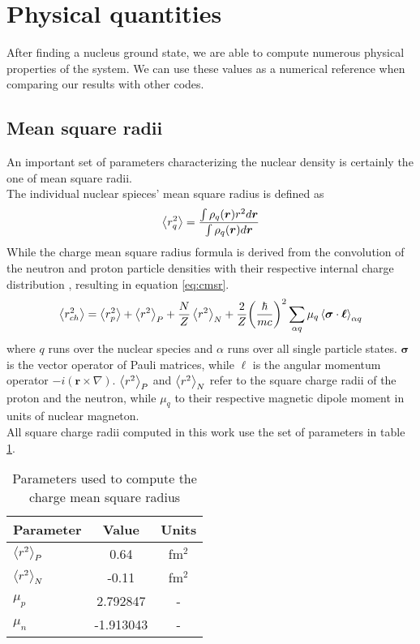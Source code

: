\section{Physical quantities}
After finding a nucleus ground state, we are able to compute numerous physical properties of the system. We can use these values as a numerical reference when comparing our results with other codes.
\subsection{Mean square radii}
An important set of parameters characterizing the nuclear density is certainly the one of mean square radii.
\\The individual nuclear spieces' mean square radius is defined as
\begin{equation}
    \label{eq:msr}
    \expval{r^2_q} = \frac{\int\rho_q(\bm r) r^2 d\bm r}{\int \rho_q(\bm r) d\bm r}
\end{equation}
While the charge mean square radius formula is derived from the convolution of the neutron and proton particle densities with their respective internal charge distribution \cite{BERTOZZI1972408}, resulting in equation \ref{eq:cmsr}.
\begin{equation}
    \label{eq:cmsr}
    \expval{r^2_{ch}} = \expval{r^2_p} + \expval{r^2}_P + \frac N Z \expval{r^2}_N + \frac 2 Z \bigg(\frac{ \hbar}{mc}\bigg)^2\sum_{\alpha q}\mu_q \expval{\bm \sigma\cdot \bm {\ell}}_{\alpha q}
\end{equation}
where $q$ runs over the nuclear species and $\alpha$ runs over all single particle states. $\bm \sigma$ is the vector operator of Pauli matrices, while $\bm {\ell}$ is the angular momentum operator $-i(\bm r \times \nabla)$.
$\expval{r^2}_P$ and $\expval{r^2}_N$ refer to the square charge radii of the proton and the neutron, while $\mu_q$ to their respective magnetic dipole moment in units of nuclear magneton.
\\All square charge radii computed in this work use the set of parameters in table \ref{tab:charge_par}.
\begin{table}[ht]
  \centering
  \begin{tabular}{lcc}
    \toprule
    \textbf{Parameter} & \textbf{Value} & \textbf{Units} \\
    \midrule
    $\expval{r^2}_P$ & 0.64 & fm$^2$ \\
    $\expval{r^2}_N$ & -0.11 & fm$^2$ \\
    $\mu_p$ & 2.792847 & - \\
    $\mu_n$ & -1.913043 & - \\
    \bottomrule
  \end{tabular}
  \caption{Parameters used to compute the charge mean square radius}
  \label{tab:charge_par}
\end{table}

